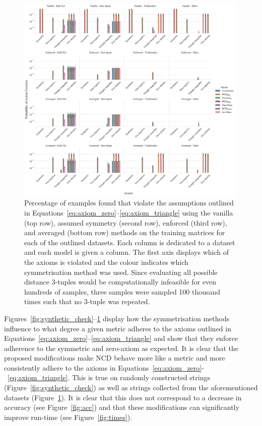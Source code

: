 \documentclass[preprint,12pt]{article}
\begin{document}
\begin{figure}[ht!]
    \centering
    \includegraphics[width=0.99\textwidth]{images/real_world_check.pdf}
    \caption{Percentage of examples found that violate the assumptions outlined in Equations~\ref{eq:axiom_zero}--\ref{eq:axiom_triangle} using the vanilla (top row), assumed symmetry (second row), enforced (third row), and averaged (bottom row) methods on the training matrices for each of the outlined datasets. Each column is dedicated to a dataset and each model is given a column. The first axis displays which of the axioms is violated and the colour indicates which symmetrisation method was used. Since evaluating all possible distance 3-tuples would be computationally infeasible for even hundreds of samples, three samples were sampled  100 thousand times such that no 3-tuple was repeated. }
    \label{fig:real_world_check}
\end{figure}

Figures~\ref{fig:synthetic_check}--\ref{fig:real_world_check} display how the symmetrisation methods influence to what degree a given metric adheres to the axioms outlined in Equations~\ref{eq:axiom_zero}--\ref{eq:axiom_triangle} and show that they enforce adherence to the symmetric and zero-axiom as expected.
It is clear that the proposed modifications make NCD behave more like a metric and more consistently adhere to the axioms in Equations~\ref{eq:axiom_zero}-~\ref{eq:axiom_triangle}. 
This is true on randomly constructed strings (Figure~\ref{fig:synthetic_check}) as well as strings collected from the aforementioned datasets (Figure~\ref{fig:real_world_check}). 
It is clear that this does not correspond to a decrease in accuracy (see Figure~\ref{fig:acc}) and that these modifications can significantly improve run-time (see Figure~\ref{fig:times}).
\end{document}
